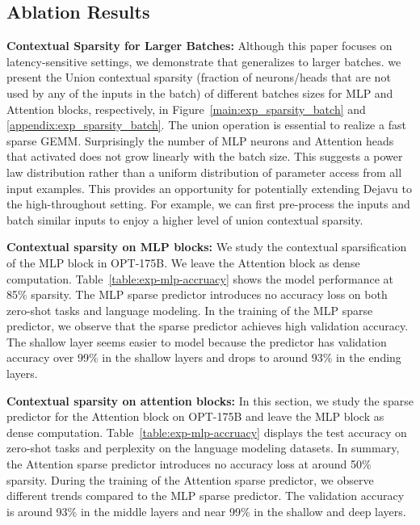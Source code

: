 \subsection{Ablation Results}
\label{sec:abalation_mlp_att}

\textbf{Contextual Sparsity for Larger Batches:} Although this paper focuses on latency-sensitive settings, we demonstrate that \name{} generalizes to larger batches. we present the Union contextual sparsity (fraction of neurons/heads that are not used by any of the inputs in the batch) of different batches sizes for MLP and Attention blocks, respectively, in Figure~\ref{main:exp_sparsity_batch} and \ref{appendix:exp_sparsity_batch}. The union operation is essential to realize a fast sparse GEMM. Surprisingly the number of MLP neurons and Attention heads that \name{} activated does not grow linearly with the batch size. This suggests a power law distribution rather than a uniform distribution of parameter access from all input examples. This provides an opportunity for potentially extending Dejavu to the high-throughout setting. For example, we can first pre-process the inputs and batch similar inputs to enjoy a higher level of union contextual sparsity.

\textbf{Contextual sparsity on MLP blocks:} We study the contextual sparsification of the MLP block in OPT-175B. We leave the Attention block as dense computation. Table~\ref{table:exp-mlp-accruacy} shows the model performance at 85\% sparsity. The MLP sparse predictor introduces no accuracy loss on both zero-shot tasks and language modeling. In the training of the MLP sparse predictor, we observe that the sparse predictor achieves high validation accuracy. The shallow layer seems easier to model because the predictor has validation accuracy over 99\% in the shallow layers and drops to around 93\% in the ending layers. 

\textbf{Contextual sparsity on attention blocks:} In this section, we study the sparse predictor for the Attention block on OPT-175B and leave the MLP block as dense computation. Table~\ref{table:exp-mlp-accruacy} displays the test accuracy on zero-shot tasks and perplexity on the language modeling datasets. In summary, the Attention sparse predictor introduces no accuracy loss at around 50\% sparsity. During the training of the Attention sparse predictor, we observe different trends compared to the MLP sparse predictor. The validation accuracy is around 93\% in the middle layers and near 99\% in the shallow and deep layers.



